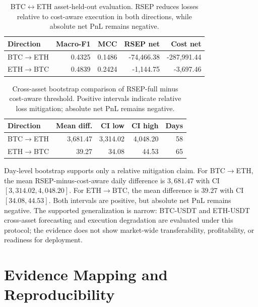 \documentclass[conference]{IEEEtran}
\begin{document}
\begin{table}[t]
\centering
\caption{BTC$\leftrightarrow$ETH asset-held-out evaluation. RSEP reduces losses relative to cost-aware execution in both directions, while absolute net PnL remains negative.}
\label{tab:cross_asset}
\footnotesize
\begin{tabular}{lrrrr}
\toprule
Direction & Macro-F1 & MCC & RSEP net & Cost net \\
\midrule
BTC$\rightarrow$ETH & 0.4325 & 0.1486 & -74,466.38 & -287,991.44 \\
ETH$\rightarrow$BTC & 0.4839 & 0.2424 & -1,144.75 & -3,697.46 \\
\bottomrule
\end{tabular}
\end{table}

\begin{table}[t]
\centering
\caption{Cross-asset bootstrap comparison of RSEP-full minus cost-aware threshold. Positive intervals indicate relative loss mitigation; absolute net PnL remains negative.}
\label{tab:cross_asset_bootstrap}
\footnotesize
\begin{tabular}{lrrrr}
\toprule
Direction & Mean diff. & CI low & CI high & Days \\
\midrule
BTC$\rightarrow$ETH & 3,681.47 & 3,314.02 & 4,048.20 & 58 \\
ETH$\rightarrow$BTC & 39.27 & 34.08 & 44.53 & 65 \\
\bottomrule
\end{tabular}
\end{table}

Day-level bootstrap supports only a relative mitigation claim. For BTC$\rightarrow$ETH, the mean RSEP-minus-cost-aware daily difference is $3{,}681.47$ with CI $[3{,}314.02,4{,}048.20]$. For ETH$\rightarrow$BTC, the mean difference is $39.27$ with CI $[34.08,44.53]$. Both intervals are positive, but absolute net PnL remains negative. The supported generalization is narrow: BTC-USDT and ETH-USDT cross-asset forecasting and execution degradation are evaluated under this protocol; the evidence does not show market-wide transferability, profitability, or readiness for deployment.

\section{Evidence Mapping and Reproducibility}
\end{document}
